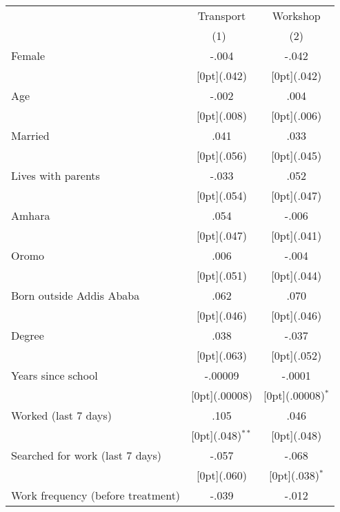 \begin{tabular*}{\textwidth}{@{\extracolsep{\fill}}lcc}		
\hline
	& \multicolumn{1}{c}{Transport} &	\multicolumn{1}{c}{Workshop} \\
\cline{2-3}		
	& \multicolumn{1}{c}{(1)\mbox{\ }} &	\multicolumn{1}{c}{(2)} \\
\hline		
Female &	-.004 &	-.042 \\
&	\raisebox{.7ex}[0pt]{\scriptsize (.042)} &	\raisebox{.7ex}[0pt]{\scriptsize (.042)} \\
Age &	-.002 &	.004 \\
&	\raisebox{.7ex}[0pt]{\scriptsize (.008)} &	\raisebox{.7ex}[0pt]{\scriptsize (.006)} \\
Married &	.041 &	.033 \\
&	\raisebox{.7ex}[0pt]{\scriptsize (.056)} &	\raisebox{.7ex}[0pt]{\scriptsize (.045)} \\
Lives with parents &	-.033 &	.052 \\
&	\raisebox{.7ex}[0pt]{\scriptsize (.054)} &	\raisebox{.7ex}[0pt]{\scriptsize (.047)} \\
Amhara &	.054 &	-.006 \\
&	\raisebox{.7ex}[0pt]{\scriptsize (.047)} &	\raisebox{.7ex}[0pt]{\scriptsize (.041)} \\
Oromo &	.006 &	-.004 \\
&	\raisebox{.7ex}[0pt]{\scriptsize (.051)} &	\raisebox{.7ex}[0pt]{\scriptsize (.044)} \\
Born outside Addis Ababa &	.062 &	.070 \\
&	\raisebox{.7ex}[0pt]{\scriptsize (.046)} &	\raisebox{.7ex}[0pt]{\scriptsize (.046)} \\
Degree &	.038 &	-.037 \\
&	\raisebox{.7ex}[0pt]{\scriptsize (.063)} &	\raisebox{.7ex}[0pt]{\scriptsize (.052)} \\
Years since school &	-.00009 &	-.0001 \\
&	\raisebox{.7ex}[0pt]{\scriptsize (.00008)} &	\raisebox{.7ex}[0pt]{\scriptsize (.00008)$^{*}$} \\
Worked (last 7 days) &	.105 &	.046 \\
&	\raisebox{.7ex}[0pt]{\scriptsize (.048)$^{**}$} &	\raisebox{.7ex}[0pt]{\scriptsize (.048)} \\
Searched for work (last 7 days) &	-.057 &	-.068 \\
&	\raisebox{.7ex}[0pt]{\scriptsize (.060)} &	\raisebox{.7ex}[0pt]{\scriptsize (.038)$^{*}$} \\
Work frequency (before treatment) &	-.039 &	-.012 \\

\end{tabular*}
